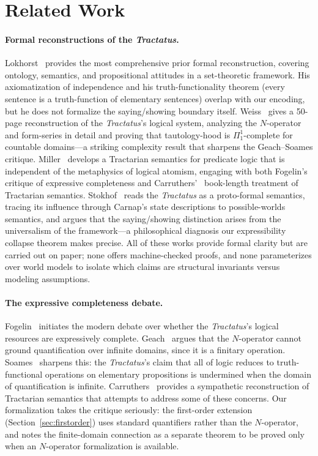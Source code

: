 \documentclass[10pt, letterpaper]{article}
\theoremstyle{definition}
\theoremstyle{remark}
\begin{document}
\section{Related Work}
\label{sec:related}

\paragraph{Formal reconstructions of the \emph{Tractatus}.}
Lokhorst~\cite{lokhorst1988} provides the most comprehensive
prior formal reconstruction, covering ontology, semantics, and
propositional attitudes in a set-theoretic framework.  His
axiomatization of independence and his truth-functionality
theorem (every sentence is a truth-function of elementary
sentences) overlap with our encoding, but he does not formalize
the saying/showing boundary itself.
Weiss~\cite{weiss2017} gives a 50-page reconstruction of the
\emph{Tractatus}'s logical system, analyzing the $N$-operator
and form-series in detail and proving that tautology-hood is
$\Pi^1_1$-complete for countable domains---a striking
complexity result that sharpens the Geach--Soames critique.
Miller~\cite{miller1995} develops a Tractarian semantics for
predicate logic that is independent of the metaphysics of
logical atomism, engaging with both Fogelin's~\cite{fogelin1987}
critique of expressive completeness and Carruthers'~\cite{carruthers1989}
book-length treatment of Tractarian semantics.
Stokhof~\cite{stokhof2008} reads the \emph{Tractatus} as a
proto-formal semantics, tracing its influence through Carnap's
state descriptions to possible-worlds semantics, and argues
that the saying/showing distinction arises from the
universalism of the framework---a philosophical diagnosis our
expressibility collapse theorem makes precise.
All of these works provide formal clarity but are carried out
on paper; none offers machine-checked proofs, and none
parameterizes over world models to isolate which claims are
structural invariants versus modeling assumptions.

\paragraph{The expressive completeness debate.}
Fogelin~\cite{fogelin1987} initiates the modern debate over
whether the \emph{Tractatus}'s logical resources are
expressively complete.  Geach~\cite{geach1981} argues that the
$N$-operator cannot ground quantification over infinite domains,
since it is a finitary operation.
Soames~\cite{soames1983} sharpens this: the \emph{Tractatus}'s
claim that all of logic reduces to truth-functional operations
on elementary propositions is undermined when the domain of
quantification is infinite.
Carruthers~\cite{carruthers1989} provides a sympathetic
reconstruction of Tractarian semantics that attempts to address
some of these concerns.
Our formalization takes the critique seriously: the first-order
extension (Section~\ref{sec:firstorder}) uses standard
quantifiers rather than the $N$-operator, and notes the
finite-domain connection as a separate theorem to be proved only
when an $N$-operator formalization is available.
\end{document}
